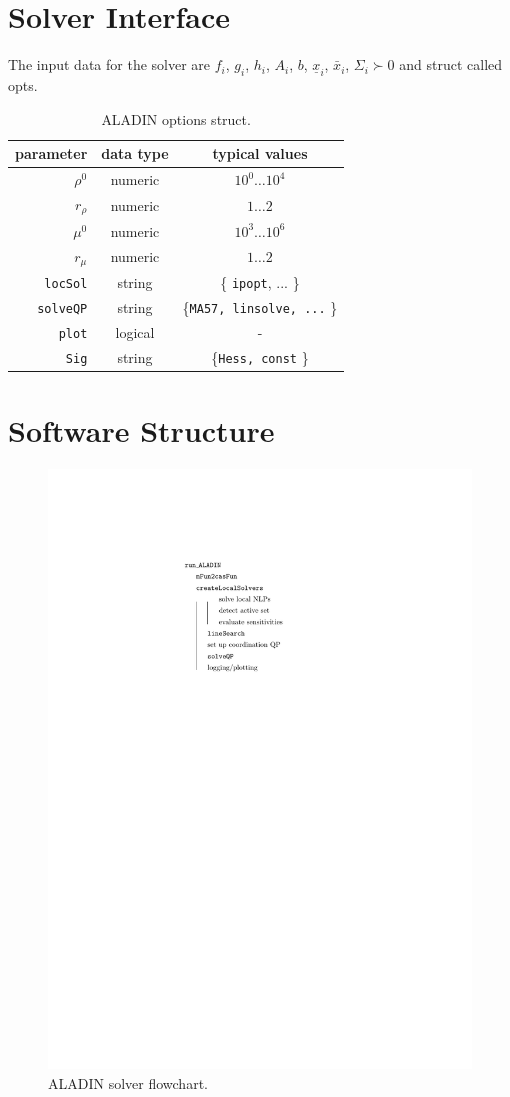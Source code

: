 \documentclass[]{scrartcl}
\begin{document}
\section{Solver Interface}
The input data for the solver are $f_i$, $g_i$, $h_i$, $A_i$, $b$, $\underline{x}_i$, $\bar x_i$, $\Sigma_i \succ 0$ and struct called opts.

\begin{table}
	\centering
	\begin{tabular}{rcc}
		\hline
parameter & data type & typical values \\ 
\hline
$\rho^0$	& numeric  & $10^0 \dots 10^4$ \\ 
	\hline 
$r_\rho$	& numeric  & $1 \dots 2$ \\ 
	\hline 
$\mu^0$	& numeric  & $10^3 \dots 10^6$ \\ 
	\hline 
$r_\mu$	& numeric  & $1 \dots 2$  \\ 
	\hline 
\texttt{locSol}	& string  &\{ \texttt{ipopt}, ... \} \\ 
	\hline 
\texttt{solveQP}	& string  & \{\texttt{MA57, linsolve, ...} \}  \\ 
	\hline 
\texttt{plot}	& logical  & -  \\ 
	\hline 
\texttt{Sig}	& string  & \{\texttt{Hess, const} \} \\ 
	\hline 
\end{tabular} 
\caption{ALADIN options struct.}
\end{table}

\section{Software Structure}
\begin{figure}
	\centering
	\includegraphics[width=0.3\linewidth]{figures/flowChart}
	\caption{ALADIN solver flowchart.}
	\label{fig:flowchart}
\end{figure}
\end{document}
